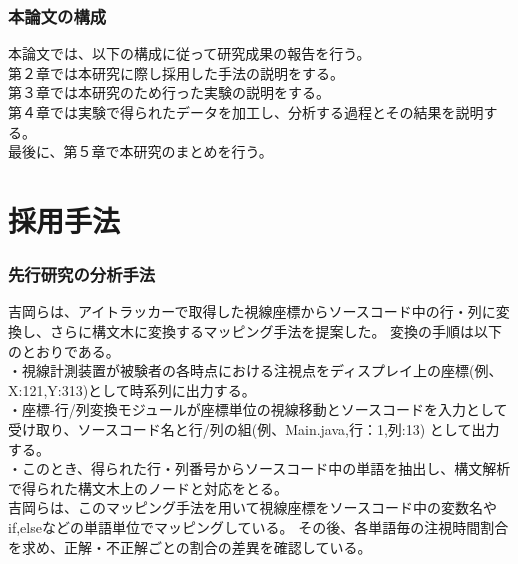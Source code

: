 \documentclass[paper=a4paper,fontsize=11pt]{jlreq}
\begin{document}
  \section{本論文の構成}
    本論文では、以下の構成に従って研究成果の報告を行う。\\
    第２章では本研究に際し採用した手法の説明をする。\\
    第３章では本研究のため行った実験の説明をする。\\
    第４章では実験で得られたデータを加工し、分析する過程とその結果を説明する。\\
    最後に、第５章で本研究のまとめを行う。

\clearpage

\part{採用手法}
  \section{先行研究の分析手法}
    吉岡らは、アイトラッカーで取得した視線座標からソースコード中の行・列に変換し、さらに構文木に変換するマッピング手法を提案した\cite{meiji2021}。
    変換の手順は以下のとおりである。\\
    ・視線計測装置が被験者の各時点における注視点をディスプレイ上の座標(例、X:121,Y:313)として時系列に出力する。\\
    ・座標-行/列変換モジュールが座標単位の視線移動とソースコードを入力として受け取り、ソースコード名と行/列の組(例、Main.java,行：1,列:13)
    として出力する。\\
    ・このとき、得られた行・列番号からソースコード中の単語を抽出し、構文解析で得られた構文木上のノードと対応をとる。\\
    
    吉岡らは、このマッピング手法を用いて視線座標をソースコード中の変数名やif,elseなどの単語単位でマッピングしている。
    その後、各単語毎の注視時間割合を求め、正解・不正解ごとの割合の差異を確認している。
  \clearpage
\end{document}
